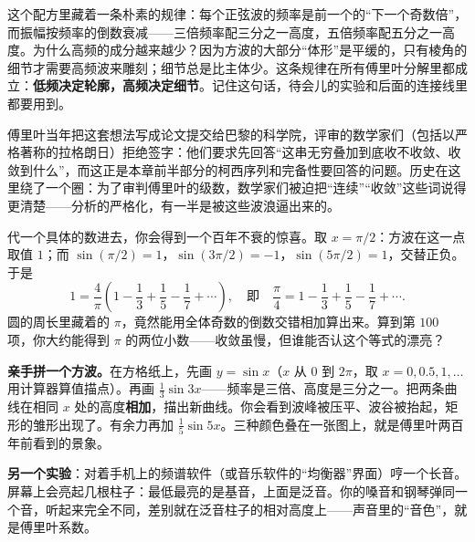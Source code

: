 这个配方里藏着一条朴素的规律：每个正弦波的频率是前一个的“下一个奇数倍”，而振幅按频率的倒数衰减——三倍频率配三分之一高度，五倍频率配五分之一高度。为什么高频的成分越来越少？因为方波的大部分“体形”是平缓的，只有棱角的细节才需要高频波来雕刻；细节总是比主体少。这条规律在所有傅里叶分解里都成立：\textbf{低频决定轮廓，高频决定细节}。记住这句话，待会儿的实验和后面的连接线里都要用到。

傅里叶当年把这套想法写成论文提交给巴黎的科学院，评审的数学家们（包括以严格著称的拉格朗日）拒绝签字：他们要求先回答“这串无穷叠加到底收不收敛、收敛到什么”，而这正是本章前半部分的柯西序列和完备性要回答的问题。历史在这里绕了一个圈：为了审判傅里叶的级数，数学家们被迫把“连续”“收敛”这些词说得更清楚——分析的严格化，有一半是被这些波浪逼出来的。

\begin{center}
\end{center}

代一个具体的数进去，你会得到一个百年不衰的惊喜。取 $x=\pi/2$：方波在这一点取值 $1$；而 $\sin(\pi/2)=1$，$\sin(3\pi/2)=-1$，$\sin(5\pi/2)=1$，交替正负。于是
\[
1=\frac{4}{\pi}\left(1-\frac13+\frac15-\frac17+\cdots\right),
\quad\text{即}\quad
\frac{\pi}{4}=1-\frac13+\frac15-\frac17+\cdots .
\]
圆的周长里藏着的 $\pi$，竟然能用全体奇数的倒数交错相加算出来。算到第 $100$ 项，你大约能得到 $\pi$ 的两位小数——收敛虽慢，但谁能否认这个等式的漂亮？

\begin{shiyan}
\textbf{亲手拼一个方波。}在方格纸上，先画 $y=\sin x$（$x$ 从 $0$ 到 $2\pi$，取 $x=0, 0.5, 1, \dots$ 用计算器算值描点）。再画 $\frac{1}{3}\sin 3x$——频率是三倍、高度是三分之一。把两条曲线在相同 $x$ 处的高度\textbf{相加}，描出新曲线。你会看到波峰被压平、波谷被抬起，矩形的雏形出现了。有余力再加 $\frac{1}{5}\sin 5x$。三种颜色叠在一张图上，就是傅里叶两百年前看到的景象。

\textbf{另一个实验}：对着手机上的频谱软件（或音乐软件的“均衡器”界面）哼一个长音。屏幕上会亮起几根柱子：最低最亮的是基音，上面是泛音。你的嗓音和钢琴弹同一个音，听起来完全不同，差别就在泛音柱子的相对高度上——声音里的“音色”，就是傅里叶系数。
\end{shiyan}

